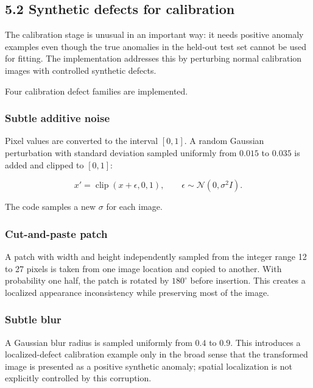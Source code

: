\documentclass[
  11pt,
]{article}
\begin{document}
\subsection{5.2 Synthetic defects for
calibration}\label{synthetic-defects-for-calibration}

The calibration stage is unusual in an important way: it needs positive
anomaly examples even though the true anomalies in the held-out test set
cannot be used for fitting. The implementation addresses this by
perturbing normal calibration images with controlled synthetic defects.

Four calibration defect families are implemented.

\subsubsection{Subtle additive noise}\label{subtle-additive-noise}

Pixel values are converted to the interval \([0,1]\). A random Gaussian
perturbation with standard deviation sampled uniformly from \(0.015\) to
\(0.035\) is added and clipped to \([0,1]\):

\[
x'=\operatorname{clip}(x+\epsilon,0,1),
\qquad
\epsilon\sim\mathcal{N}(0,\sigma^2 I).
\]

The code samples a new \(\sigma\) for each image.

\subsubsection{Cut-and-paste patch}\label{cut-and-paste-patch}

A patch with width and height independently sampled from the integer
range 12 to 27 pixels is taken from one image location and copied to
another. With probability one half, the patch is rotated by
\(180^\circ\) before insertion. This creates a localized appearance
inconsistency while preserving most of the image.

\subsubsection{Subtle blur}\label{subtle-blur}

A Gaussian blur radius is sampled uniformly from \(0.4\) to \(0.9\).
This introduces a localized-defect calibration example only in the broad
sense that the transformed image is presented as a positive synthetic
anomaly; spatial localization is not explicitly controlled by this
corruption.
\end{document}

